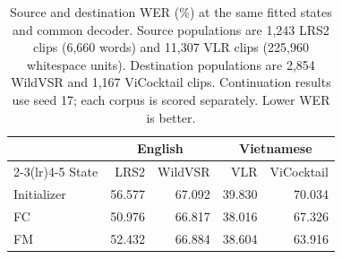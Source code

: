 \begin{table}[tbp]
\centering\small
\caption{Source and destination WER (\%) at the same fitted states and
common decoder. Source populations are 1,243 LRS2 clips (6,660 words)
and 11,307 VLR clips (225,960 whitespace units). Destination populations
are 2,854 WildVSR and 1,167 ViCocktail clips. Continuation results use seed 17;
each corpus is scored separately. Lower WER is better.}
\label{tab:source}
\begin{tabular}{lrrrr}
\toprule
& \multicolumn{2}{c}{English} & \multicolumn{2}{c}{Vietnamese}\\
\cmidrule(lr){2-3}\cmidrule(lr){4-5}
State & LRS2 & WildVSR & VLR & ViCocktail\\
\midrule
Initializer & 56.577 & 67.092 & 39.830 & 70.034\\
FC & 50.976 & 66.817 & 38.016 & 67.326\\
FM & 52.432 & 66.884 & 38.604 & 63.916\\
\bottomrule
\end{tabular}
\end{table}

